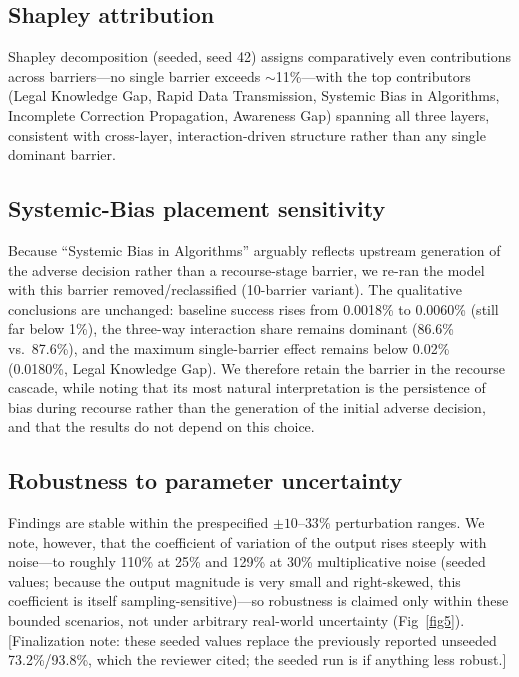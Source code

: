 \documentclass[10pt,letterpaper]{article}
\begin{document}
\subsection*{Shapley attribution}
Shapley decomposition (seeded, seed 42) assigns comparatively even contributions across barriers---no single barrier exceeds $\sim$11\%---with the top contributors (Legal Knowledge Gap, Rapid Data Transmission, Systemic Bias in Algorithms, Incomplete Correction Propagation, Awareness Gap) spanning all three layers, consistent with cross-layer, interaction-driven structure rather than any single dominant barrier.

\subsection*{Systemic-Bias placement sensitivity}
Because ``Systemic Bias in Algorithms'' arguably reflects upstream generation of the adverse decision rather than a recourse-stage barrier, we re-ran the model with this barrier removed/reclassified (10-barrier variant). The qualitative conclusions are unchanged: baseline success rises from 0.0018\% to 0.0060\% (still far below 1\%), the three-way interaction share remains dominant (86.6\% vs.\ 87.6\%), and the maximum single-barrier effect remains below 0.02\% (0.0180\%, Legal Knowledge Gap). We therefore retain the barrier in the recourse cascade, while noting that its most natural interpretation is the persistence of bias during recourse rather than the generation of the initial adverse decision, and that the results do not depend on this choice.

\subsection*{Robustness to parameter uncertainty}
Findings are stable within the prespecified $\pm10$--$33\%$ perturbation ranges. We note, however, that the coefficient of variation of the output rises steeply with noise---to roughly 110\% at 25\% and 129\% at 30\% multiplicative noise (seeded values; because the output magnitude is very small and right-skewed, this coefficient is itself sampling-sensitive)---so robustness is claimed only within these bounded scenarios, not under arbitrary real-world uncertainty (Fig~\ref{fig5}). [Finalization note: these seeded values replace the previously reported unseeded 73.2\%/93.8\%, which the reviewer cited; the seeded run is if anything less robust.]

\end{document}

